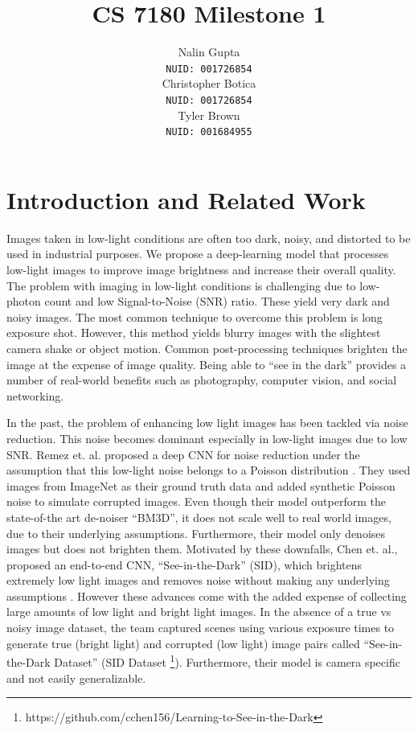 \documentclass{article}
\title{CS 7180 Milestone 1}
\author{%
  Nalin Gupta \\
  \texttt{NUID: 001726854} \\
  \And
  Christopher Botica\\
  \texttt{NUID: 001726854} \\
  \And
  Tyler Brown\\
  \texttt{NUID: 001684955} \\
}
\begin{document}

\maketitle

\section{Introduction and Related Work}

Images taken in low-light conditions are often too dark, noisy, and distorted to be used in industrial purposes. We propose a deep-learning model that processes low-light
images to improve image brightness and increase their overall quality. The
problem with imaging in low-light conditions is challenging due to low-photon count and low Signal-to-Noise (SNR) ratio. These yield very dark and noisy
images. The most common technique to overcome this problem is long exposure
shot. However, this method yields blurry images with the slightest camera
shake
or object motion\cite{chen2018learning}. Common post-processing techniques brighten the image at the expense of image quality. Being able to ``see in the dark'' provides a
number of real-world benefits such as photography, computer vision, and
social networking. \newline

In the past, the problem of enhancing low light images has been tackled via
noise reduction. This noise becomes dominant especially in low-light images
due to low SNR. Remez et. al. proposed a deep CNN for noise reduction under
the assumption that this low-light noise belongs to a Poisson
distribution \cite{remez2017deep}.  They used images from ImageNet
\cite{imagenet_cvpr09} as their ground truth data
and added synthetic Poisson noise to simulate corrupted images. Even though
their model outperform the state-of-the art de-noiser ``BM3D'', it does not
scale well to real world images, due to their underlying assumptions.
Furthermore, their model only denoises images but does not brighten them.
Motivated by these downfalls, Chen et. al., proposed an end-to-end CNN,
``See-in-the-Dark'' (SID), which brightens extremely low light images and
removes noise without making any underlying assumptions
\cite{chen2018learning}. However these advances come with the added expense
of collecting large amounts of low
light and bright light images. In the absence of a true vs noisy image
dataset, the team captured scenes using various exposure times to generate
true (bright light) and corrupted (low light) image pairs called
``See-in-the-Dark Dataset'' (SID Dataset \footnote{https://github.com/cchen156/Learning-to-See-in-the-Dark}). Furthermore, their model is camera
specific and not easily generalizable.\newline
\end{document}
